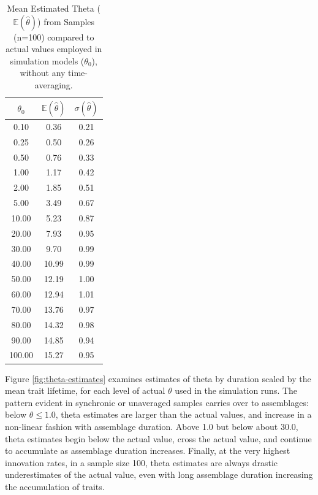 \begin{table}[ht]
\begin{tabular}{|c|c|c|}
  \hline
$\theta_0$ & $\mathbb{E}(\hat{\theta})$ & $\sigma(\hat{\theta})$ \\ 
  \hline
0.10 & 0.36 & 0.21 \\ 
  0.25 & 0.50 & 0.26 \\ 
  0.50 & 0.76 & 0.33 \\ 
  1.00 & 1.17 & 0.42 \\ 
  2.00 & 1.85 & 0.51 \\ 
  5.00 & 3.49 & 0.67 \\ 
  10.00 & 5.23 & 0.87 \\ 
  20.00 & 7.93 & 0.95 \\ 
  30.00 & 9.70 & 0.99 \\ 
  40.00 & 10.99 & 0.99 \\ 
  50.00 & 12.19 & 1.00 \\ 
  60.00 & 12.94 & 1.01 \\ 
  70.00 & 13.76 & 0.97 \\ 
  80.00 & 14.32 & 0.98 \\ 
  90.00 & 14.85 & 0.94 \\ 
  100.00 & 15.27 & 0.95 \\ 
   \hline
\end{tabular}
\caption{Mean Estimated Theta ($\mathbb{E}(\hat{\theta})$) from Samples (n=100) compared to actual values employed in simulation models ($\theta_0$), without any time-averaging.}
\label{tab:estimated-theta-unaveraged}
\end{table}

Figure \ref{fig:theta-estimates} examines estimates of theta by \timeav duration scaled by the mean trait lifetime, for each level of actual $\theta$ used in the simulation runs.  The pattern evident in synchronic or unaveraged samples carries over to \timeavd assemblages:  below $\theta \leq 1.0$, theta estimates are larger than the actual values, and increase in a non-linear fashion with assemblage duration.  Above 1.0 but below about 30.0, theta estimates begin below the actual value, cross the actual value, and continue to accumulate as assemblage duration increases.  Finally, at the very highest innovation rates, in a sample size 100, theta estimates are always drastic underestimates of the actual value, even with long assemblage duration increasing the accumulation of traits.  

